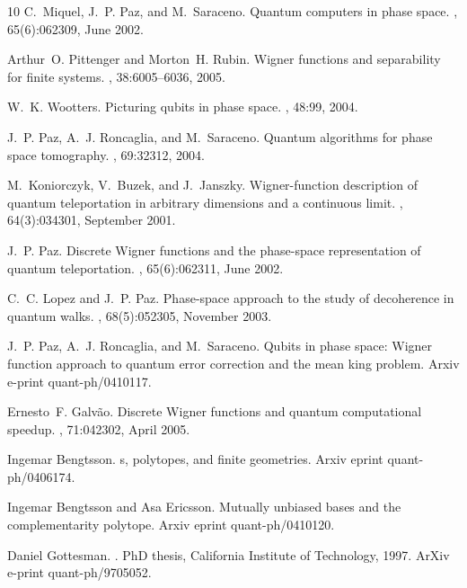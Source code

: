 \documentclass[aps,twocolumn,showpacs,nofootinbib,superscriptaddress]{revtex4}
\begin{document}
\begin{thebibliography}{10}
C.~Miquel, J.~P. Paz, and M.~Saraceno.
\newblock Quantum computers in phase space.
, 65(6):062309, June 2002.

Arthur~O. Pittenger and Morton~H. Rubin.
\newblock Wigner functions and separability for finite systems.
, 38:6005--6036, 2005.

W.~K. Wootters.
\newblock Picturing qubits in phase space.
, 48:99, 2004.

J.~P. Paz, A.~J. Roncaglia, and M.~Saraceno.
\newblock Quantum algorithms for phase space tomography.
, 69:32312, 2004.

M.~Koniorczyk, V.~Buzek, and J.~Janszky.
\newblock Wigner-function description of quantum teleportation in arbitrary
  dimensions and a continuous limit.
, 64(3):034301, September 2001.

J.~P. Paz.
\newblock Discrete {W}igner functions and the phase-space representation of
  quantum teleportation.
, 65(6):062311, June 2002.

C.~C. Lopez and J.~P. Paz.
\newblock Phase-space approach to the study of decoherence in quantum walks.
, 68(5):052305, November 2003.

J.~P. Paz, A.~J. Roncaglia, and M.~Saraceno.
\newblock Qubits in phase space: {W}igner function approach to quantum error
  correction and the mean king problem.
\newblock Arxiv e-print quant-ph/0410117.

Ernesto~F. Galv{\~a}o.
\newblock Discrete {W}igner functions and quantum computational speedup.
, 71:042302, April 2005.

Ingemar Bengtsson.
s, polytopes, and finite geometries.
\newblock Arxiv eprint quant-ph/0406174.

Ingemar Bengtsson and Asa Ericsson.
\newblock Mutually unbiased bases and the complementarity polytope.
\newblock Arxiv eprint quant-ph/0410120.

Daniel Gottesman.
.
\newblock PhD thesis, California Institute of Technology, 1997.
\newblock ArXiv e-print quant-ph/9705052.


\end{thebibliography}
\end{document}
